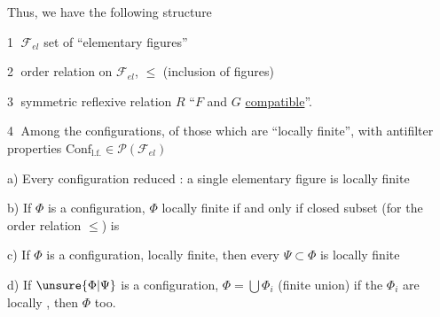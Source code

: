 
Thus, we have  the following structure

\textcircled{1} $\mathcal{F}_{el}$ set of ``elementary figures''

\textcircled{2} order relation on $\mathcal{F}_{el}$, $\leq$ (inclusion of figures)

\textcircled{3} symmetric reflexive relation $R$  ``$F$ and $G$ \uline{compatible}''.\  



\textcircled{4}  Among the configurations,      of those which are ``locally finite'', with  antifilter properties \unsure{;|,} $\mathrm{Conf}_{\mathrm{l.f.}}\in\mathcal{P}(\mathcal{F}_{el})$

a) Every configuration reduced : a single elementary figure is locally finite


b) If $\Phi$ is a configuration, $\Phi$ locally finite if and only if   closed subset (for the order relation $\leq$) is

c) If $\Phi$ is a configuration,  locally finite, then every $\Psi\subset\Phi$ is locally finite

d) If $\unsure{\Phi|\Psi}$ is a configuration, $\Phi=\bigcup\Phi_i$ (finite union) if the $\Phi_i$ are locally , then $\Phi$ too.
